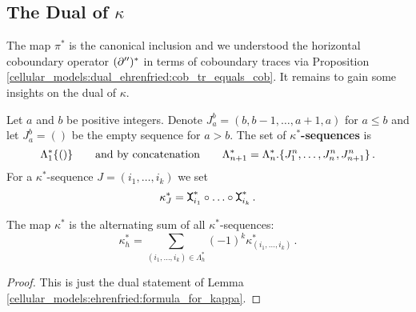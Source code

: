 \subsection{The Dual of \texorpdfstring{$\kappa$}{kappa}}
\label{cellular_models:dual_ehrenfried:kappa_dual}
The map $\pi^\ast$ is the canonical inclusion and we understood the horizontal coboundary operator $(\partial'')^\ast$ in terms of coboundary traces via Proposition \ref{cellular_models:dual_ehrenfried:cob_tr_equals_cob}.
It remains to gain some insights on the dual of $\kappa$.

\begin{defi}
    \label{cellular_models:dual_ehrenfried:kappa_dual_sequences}
    Let $a$ and $b$ be positive integers.
    Denote $J_a^b = (b,b-1, \ldots, a+1, a)$ for $a \le b$ and let $J_a^b = ()$ be the empty sequence for $a > b$.
    The set of {\bf $\kappa^\ast$-sequences} is
    \[
        \Lambda^\ast_1 \{ () \} \mspc{and by concatenation}{20} \Lambda^\ast_{n+1} = \Lambda^\ast_n.\{ J_1^n, \ldots, J_n^n, J_{n+1}^n \} \,.
    \]
    For a $\kappa^\ast$-sequence $J = (i_1, \ldots, i_k)$ we set
    \[
        \kappa^\ast_J = \mueta^\ast_{i_1} \circ \ldots \circ \mueta^\ast_{i_k} \,.
    \]
\end{defi}

\begin{lem}
    \label{cellular_models:dual_ehrenfried:formula_for_kappa_dual}
    The map $\kappa^\ast$ is the alternating sum of all $\kappa^\ast$-sequences:
    \[
        \kappa^\ast_h = \sum_{(i_1, \ldots, i_k) \in \Lambda^\ast_h} (-1)^k \kappa^\ast_{(i_1, \ldots, i_k)} \,.
    \]
\end{lem}

\begin{proof}
    This is just the dual statement of Lemma \ref{cellular_models:ehrenfried:formula_for_kappa}.
\end{proof}

